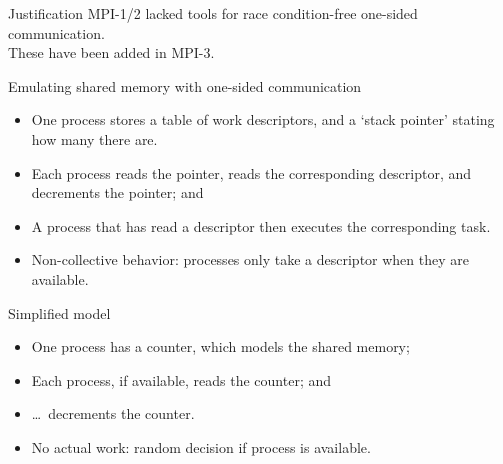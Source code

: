 
\begin{numberedframe}{Justification}
  MPI-1/2 lacked tools for race condition-free one-sided communication.\\
  These have been added in MPI-3.
\end{numberedframe}

\begin{numberedframe}{Emulating shared memory with one-sided communication}
  \begin{itemize}
  \item One process stores a table of work descriptors, and a `stack pointer'
    stating how many there are.
  \item Each process reads the pointer, reads the corresponding
    descriptor, and decrements the pointer; and
  \item A process that has read a descriptor then executes the
    corresponding task.
  \item Non-collective behavior: processes only take a descriptor when they are available.
  \end{itemize}
\end{numberedframe}

\begin{numberedframe}{Simplified model}
  \begin{itemize}
  \item One process has a counter, which models the shared memory;
  \item Each process, if available, reads the counter; and
  \item \ldots~decrements the counter.
  \item No actual work: random decision if process is available.
  \end{itemize}
\end{numberedframe}

